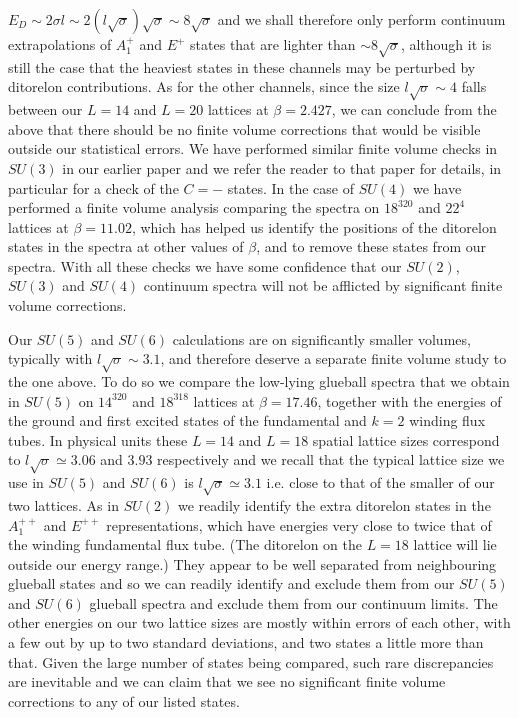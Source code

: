 \documentclass[12pt]{article}
\begin{document}
$E_D \sim 2\sigma l \sim 2 (l\surd\sigma)\surd\sigma \sim 8\surd\sigma$ and we shall therefore
only perform continuum extrapolations of $A_1^{+}$ and $E^{+}$ states that are lighter than
$\sim 8\surd\sigma$, although it is still the case that the heaviest states in these channels
may be perturbed by ditorelon contributions. As for the other channels, since the size
$l\surd\sigma \sim 4$ falls between our $L=14$ and $L=20$ lattices
at $\beta=2.427$, we can conclude from the above that there should be no finite volume
corrections that would be visible outside our statistical errors.
We have performed similar finite volume checks in $SU(3)$ in our earlier paper
\cite{AAMT-2020}
and we refer the reader to that paper for details, in particular for a check of the $C=-$ states.
In the case of $SU(4)$ we have performed a finite volume analysis comparing the spectra on
$18^320$ and $22^4$ lattices at $\beta=11.02$, which has helped us identify the
positions of the ditorelon states in the spectra at other values of $\beta$, and to
remove these states from our spectra. With all these checks we have some confidence
that our $SU(2)$, $SU(3)$ and $SU(4)$ continuum spectra will not be afflicted by significant
finite volume corrections.


Our $SU(5)$ and $SU(6)$ calculations are on significantly smaller volumes, typically with
$l\surd\sigma \sim 3.1$, and therefore deserve a separate finite volume study to the one above.
To do so we compare the low-lying glueball spectra that we obtain in $SU(5)$ on $14^320$ and $18^318$
lattices at $\beta=17.46$, together with the energies of the ground and first excited states of
the fundamental and $k=2$ winding flux tubes. In physical units these $L=14$ and $L=18$ spatial
lattice sizes correspond to $l\surd\sigma \simeq 3.06$ and $3.93$ respectively and we recall
that the typical lattice size we use in $SU(5)$ and $SU(6)$ is $l\surd\sigma \simeq 3.1$ i.e. close
to that of the smaller of our two lattices. As in $SU(2)$
we readily identify the extra ditorelon states in the $A_1^{++}$ and $E^{++}$ representations,
which have energies very close to twice that of the winding fundamental flux tube.
(The ditorelon on the $L=18$ lattice will lie outside our energy range.) They appear
to be well separated from neighbouring glueball states and so we can readily identify and
exclude them from our $SU(5)$ and $SU(6)$ glueball spectra and exclude them from our
continuum limits. The other energies
on our two lattice sizes are mostly within errors of each other, with a few out by up to two
standard deviations, and two states a little more than that. Given the large number of states
being compared, such rare discrepancies are inevitable and we can  claim that
we see no significant finite volume corrections to any of our listed states.
\end{document}
